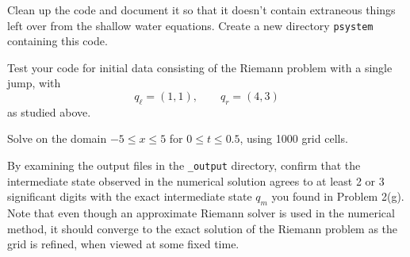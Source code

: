 \documentclass[11pt]{article}
\begin{document}
\begin{enumerate}
Clean up the code and document it so that it doesn't contain extraneous
things left over from the shallow water equations.  Create a new directory
\verb+psystem+ containing this code.

Test your code for initial data consisting of the Riemann problem with a
single jump, with 
\[
q_\ell = (1,1), \qquad q_r = (4,3)
\]
as studied above.  

Solve on the domain $-5 \leq x \leq 5$ for $0\leq t \leq 0.5$,
using 1000 grid cells.  

By examining the output files in the \verb+_output+ directory,
confirm that the intermediate
state observed in the numerical solution agrees to at least 2 or 3
significant digits with the exact intermediate state $q_m$ you found in Problem
2(g).  Note that even though an approximate Riemann solver is used in
the numerical method, it should converge to the exact solution of the
Riemann problem as the grid is refined, when viewed at some fixed time.



\end{enumerate} 
\end{document}
